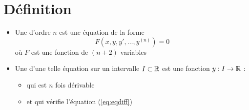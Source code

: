 \section*{Définition}

\begin{frame}

\begin{mydefinition}
\begin{itemize}
  \item Une  d'ordre $n$ est une équation de la forme
  \begin{equation}
    F\left(x,y,y',\dots ,y^{(n)}\right)=0 
    \label{eq:eqdiff}
    \tag{$E$}
  \end{equation}
  où $F$ est une fonction de $(n+2)$ variables
  
  \pause
  
  \item Une  d'une telle équation sur un intervalle $I\subset \mathbb{R}$ 
  est une fonction $y :I \to \mathbb{R}$ :
  \begin{itemize}
    \item qui est $n$ fois dérivable 
    \item et qui vérifie l'équation (\ref{eq:eqdiff})
  \end{itemize}
\end{itemize}
\end{mydefinition}
\end{frame}



